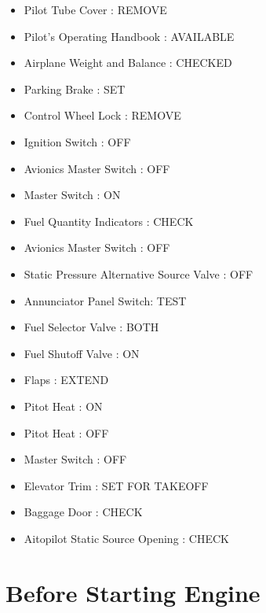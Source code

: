 \begin{itemize}
\item{} Pilot Tube Cover : REMOVE

\item{} Pilot's Operating Handbook : AVAILABLE

\item{} Airplane Weight and Balance : CHECKED

\item{} Parking Brake : SET

\item{} Control Wheel Lock : REMOVE

\item{} Ignition Switch : OFF

\item{} Avionics Master Switch : OFF

\item{} Master Switch : ON

\item{} Fuel Quantity Indicators : CHECK

\item{} Avionics Master Switch : OFF

\item{} Static Pressure Alternative Source Valve : OFF

\item{} Annunciator Panel Switch: TEST

\item{} Fuel Selector Valve : BOTH

\item{} Fuel Shutoff Valve : ON

\item{} Flaps : EXTEND

\item{} Pitot Heat : ON

\item{} Pitot Heat : OFF

\item{} Master Switch : OFF

\item{} Elevator Trim : SET FOR TAKEOFF

\item{} Baggage Door : CHECK

\item{} Aitopilot Static Source Opening : CHECK

\end{itemize}

\chapter{Before Starting Engine}
\label{beforestartingengine}

